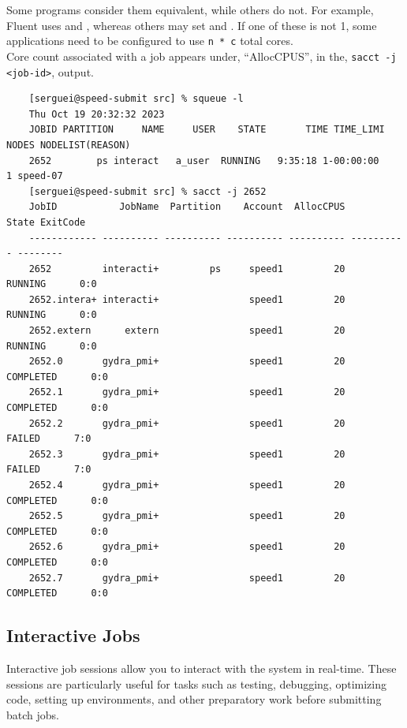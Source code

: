\noindent Some programs consider them equivalent, while others do not. For example, 
Fluent uses  and ,
whereas others may set  and .
If one of these is not 1, some applications need to be configured to use \texttt{n * c} total cores.\\

\noindent Core count associated with a job appears under,
``AllocCPUS'', in the, \texttt{sacct -j <job-id>}, output.

\small
\begin{verbatim}
	[serguei@speed-submit src] % squeue -l
	Thu Oct 19 20:32:32 2023
	JOBID PARTITION     NAME     USER    STATE       TIME TIME_LIMI  NODES NODELIST(REASON)
	2652        ps interact   a_user  RUNNING   9:35:18 1-00:00:00      1 speed-07
	[serguei@speed-submit src] % sacct -j 2652
	JobID           JobName  Partition    Account  AllocCPUS      State ExitCode
	------------ ---------- ---------- ---------- ---------- ---------- --------
	2652         interacti+         ps     speed1         20    RUNNING      0:0
	2652.intera+ interacti+                speed1         20    RUNNING      0:0
	2652.extern      extern                speed1         20    RUNNING      0:0
	2652.0       gydra_pmi+                speed1         20  COMPLETED      0:0
	2652.1       gydra_pmi+                speed1         20  COMPLETED      0:0
	2652.2       gydra_pmi+                speed1         20     FAILED      7:0
	2652.3       gydra_pmi+                speed1         20     FAILED      7:0
	2652.4       gydra_pmi+                speed1         20  COMPLETED      0:0
	2652.5       gydra_pmi+                speed1         20  COMPLETED      0:0
	2652.6       gydra_pmi+                speed1         20  COMPLETED      0:0
	2652.7       gydra_pmi+                speed1         20  COMPLETED      0:0
\end{verbatim}
\normalsize

\subsection{Interactive Jobs}
\label{sect:interactive-jobs}

Interactive job sessions allow you to interact with the system in real-time. 
These sessions are particularly useful for tasks such as testing, debugging, optimizing code, 
setting up environments, and other preparatory work before submitting batch jobs.

